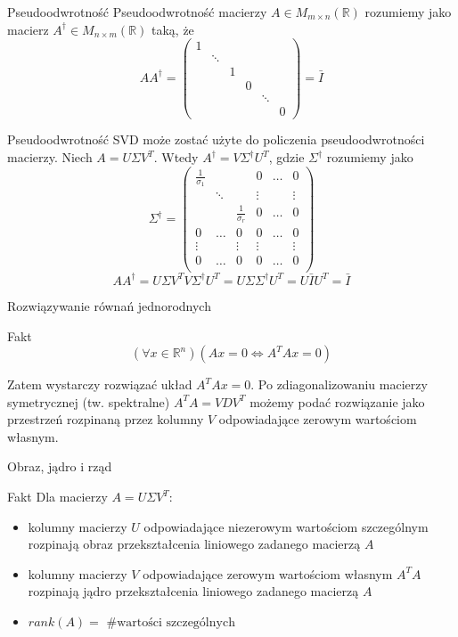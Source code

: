 \documentclass{beamer}
\begin{document}
\begin{frame}{Pseudoodwrotność}
Pseudoodwrotność macierzy $A \in M_{m \times n} (\mathbb{R})$ rozumiemy jako macierz $A^\dag \in M_{n \times m}( \mathbb{R})$ taką, że $$A A^\dag = 
\begin{pmatrix}
1 & & & & & \\
& \ddots & & & & \\
& & 1 & & & \\
& & & 0 & & \\
& & & & \ddots & \\
& & & & & 0 
\end{pmatrix} = \bar{I} $$
\end{frame}

\begin{frame}{Pseudoodwrotność}
SVD może zostać użyte do policzenia pseudoodwrotności macierzy. Niech $A = U\Sigma V^T$. Wtedy $A^\dag = V\Sigma^\dag U^T$, gdzie $\Sigma^\dag$ rozumiemy jako
$$ \Sigma^\dag = \begin{pmatrix}
\frac{1}{\sigma_1} &  & & 0 & \ldots & 0 \\
 & \ddots & & \vdots & & \vdots \\
 & & \frac{1}{\sigma_r} & 0 & \ldots & 0 \\
0 & \ldots & 0 & 0 & \ldots & 0 \\
\vdots & & \vdots & \vdots & & \vdots \\
0 & \ldots & 0 & 0 & \ldots & 0 \\
\end{pmatrix} $$
$$ A A^\dag = U \Sigma V^T V \Sigma^\dag U^T  = U \Sigma \Sigma^\dag U^T = U\bar{I} U^T = \bar{I} $$
\end{frame}

\begin{frame}{Rozwiązywanie równań jednorodnych}
    \begin{block}{Fakt}
        $$(\forall x \in \mathbb{R} ^n) (Ax=0 \Leftrightarrow A^TAx=0) $$
    \end{block}
    Zatem wystarczy rozwiązać układ $A^TAx=0$. Po zdiagonalizowaniu macierzy symetrycznej (tw. spektralne) $A^TA = VDV^T$ możemy podać rozwiązanie jako przestrzeń rozpinaną przez kolumny $V$ odpowiadające zerowym wartościom własnym. 
\end{frame}

\begin{frame}{Obraz, jądro i rząd}
    \begin{block}{Fakt}
        Dla macierzy $A = U \Sigma V^T$:
        \begin{itemize}
            \item kolumny macierzy $U$ odpowiadające niezerowym wartościom szczególnym rozpinają obraz przekształcenia liniowego zadanego macierzą $A$
            \item kolumny macierzy $V$ odpowiadające zerowym wartościom własnym $A^TA$ rozpinają jądro przekształcenia liniowego zadanego macierzą $A$
            \item $rank(A) = \text{ \# wartości szczególnych}$
        \end{itemize}
    \end{block}
\end{frame}
\end{document}
